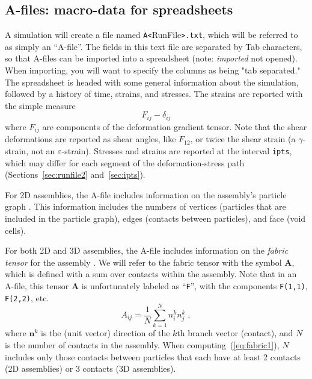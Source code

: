 \documentclass[letterpaper,11pt]{article}
\begin{document}
\subsection{A-files: macro-data for spreadsheets}\label{sec:Afiles}
A simulation will create a file named 
\texttt{A<}\textsf{RunFile}\texttt{>.txt}, which 
will be referred to as simply an ``A-file''.
The fields in this text file are separated by Tab characters, 
so that A-files can
be imported into a spreadsheet (note: \emph{imported} not opened).
When importing, you will want to specify the columns as being "tab separated."
The spreadsheet is headed with some general information about the simulation,
followed by a history of time, strains, and stresses.
The strains are reported with the simple measure
\begin{equation}\label{eq:strain}
F_{ij} - \delta_{ij}
\end{equation}
where $F_{ij}$ are components of the deformation gradient tensor.
Note that the shear deformations are reported as shear angles,
like $F_{12}$, or 
twice the shear strain (a $\gamma$-strain, not an $\varepsilon$-strain).
Stresses and strains are reported at the interval
\texttt{ipts},
which may differ for each segment
of the deformation-stress path 
(Sections~\ref{sec:runfile2} and~\ref{sec:ipts}).
%
\par
For 2D assemblies, the A-file includes information on the assembly's
particle graph \cite{Satake:1992a,Satake:1993b,Kuhn:1999a}.
This information includes the numbers of vertices (particles that are included
in the particle graph), edges (contacts between particles),
and face (void cells).
\par
For both 2D and 3D assemblies, the A-file includes information on
the \emph{fabric tensor} for the assembly \cite{Satake:1982a}.
We will refer to the fabric tensor with the symbol $\mathbf{A}$, which
is defined with a sum over contacts 
within the assembly.  Note that in an A-file, this tensor
$\mathbf{A}$ is unfortunately labeled as ``\texttt{F}'', with the components
\texttt{F(1,1)}, \texttt{F(2,2)}, etc.
\begin{equation}\label{eq:fabric1}
A_{ij} = \frac{1}{N}
\sum_{k=1}^{N}
n_{i}^{k} n_{j}^{k}\;,
\end{equation}
where $\mathbf{n}^{k}$ is the (unit vector) direction of the 
$k$th branch vector (contact),
and $N$ is the number of contacts in the assembly.
When computing~(\ref{eq:fabric1}), $N$ includes only
those contacts between particles that each have at least 2 contacts
(2D assemblies) or 3 contacts (3D assemblies).
\end{document}
